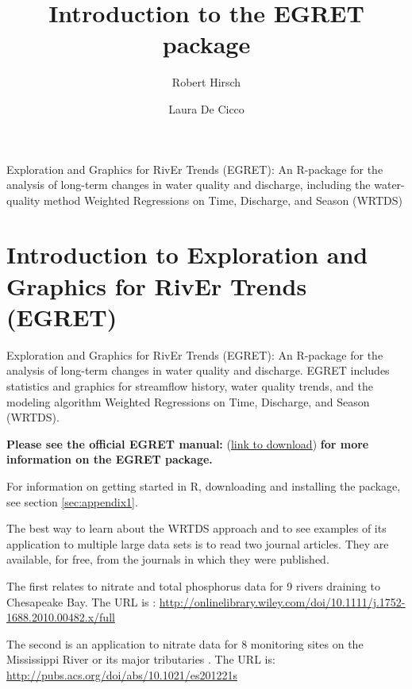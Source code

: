 \documentclass[a4paper,11pt]{article}\usepackage[]{graphicx}\usepackage[]{color}
\begin{document}
\title{Introduction to the EGRET package}
\author[1]{Robert Hirsch}
\author[1]{Laura De Cicco}

\maketitle

Exploration and Graphics for RivEr Trends (EGRET): An R-package for the analysis of long-term changes in water quality and discharge, including the water-quality method Weighted Regressions on Time, Discharge, and Season (WRTDS)

\tableofcontents

\section{Introduction to Exploration and Graphics for RivEr Trends (EGRET)}

Exploration and Graphics for RivEr Trends (EGRET): An R-package for the analysis of long-term changes in water quality and discharge. EGRET includes statistics and graphics for streamflow history, water quality trends, and the modeling algorithm Weighted Regressions on Time, Discharge, and Season (WRTDS). 


\textbf{Please see the official EGRET manual:}
(\href{https://github.com/USGS-R/EGRET/raw/Documentation/EGRET%2Bmanual_4.doc}{link to download}) 
\textbf{for more information on the EGRET package.}

For information on getting started in R, downloading and installing the package, see section \ref{sec:appendix1}.

The best way to learn about the WRTDS approach and to see examples of its application to multiple large data sets is to read two journal articles.  They are available, for free, from the journals in which they were published.

The first relates to nitrate and total phosphorus data for 9 rivers draining to Chesapeake Bay.  The URL is \cite{HirschII}: 
\url{http://onlinelibrary.wiley.com/doi/10.1111/j.1752-1688.2010.00482.x/full}

The second is an application  to nitrate data for 8 monitoring sites on the Mississippi River or its major tributaries \cite{HirschIII}.  The URL is: \url{http://pubs.acs.org/doi/abs/10.1021/es201221s}
\end{document}
